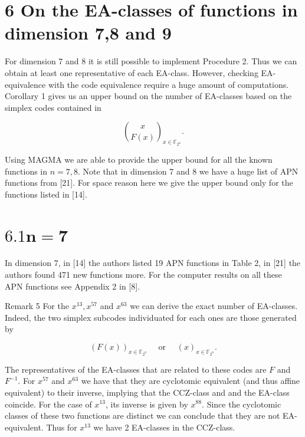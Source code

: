 \documentclass[10pt]{article}
\begin{document}
\section*{6 On the EA-classes of functions in dimension 7,8 and 9}
For dimension 7 and 8 it is still possible to implement Procedure 2. Thus we can obtain at least one representative of each EA-class. However, checking EA-equivalence with the code equivalence require a huge amount of computations. Corollary 1 gives us an upper bound on the number of EA-classes based on the simplex codes contained in

$$
\binom{x}{F(x)}_{x \in \mathbb{F}_{2^{n}}} .
$$

Using MAGMA we are able to provide the upper bound for all the known functions in $n=7,8$. Note that in dimension 7 and 8 we have a huge list of APN functions from [21]. For space reason here we give the upper bound only for the functions listed in [14].

\section*{$6.1 \mathbf{n} \boldsymbol{=} \mathbf{7}$}
In dimension 7, in [14] the authors listed 19 APN functions in Table 2, in [21] the authors found 471 new functions more. For the computer results on all these APN functions see Appendix 2 in [8].

Remark 5 For the $x^{13}, x^{57}$ and $x^{63}$ we can derive the exact number of EA-classes. Indeed, the two simplex subcodes individuated for each ones are those generated by

$$
(F(x))_{x \in \mathbb{F}_{2^{n}}} \quad \text { or } \quad(x)_{x \in \mathbb{F}_{2^{n}}} .
$$

The representatives of the EA-classes that are related to these codes are $F$ and $F^{-1}$. For $x^{57}$ and $x^{63}$ we have that they are cyclotomic equivalent (and thus affine equivalent) to their inverse, implying that the CCZ-class and and the EA-class coincide. For the case of $x^{13}$, its inverse is given by $x^{88}$. Since the cyclotomic classes of these two functions are distinct we can conclude that they are not EA-equivalent. Thus for $x^{13}$ we have 2 EA-classes in the CCZ-class.
\end{document}

